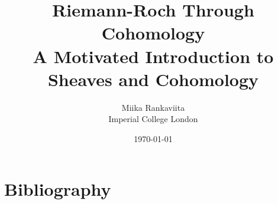 \documentclass[12pt]{article}
\begin{document}
\title{Riemann-Roch Through Cohomology\\
        \large A Motivated Introduction to Sheaves and Cohomology}
\author{Miika Rankaviita\\Imperial College London}
\date{\today}
\maketitle
\tableofcontents

\theoremstyle{plain}
\newtheorem{thm}{Theorem}[section]
\newtheorem{cor}{Corollary}[thm]
\newtheorem{prop}[thm]{Proposition}
\newtheorem{lemm}[thm]{Lemma}
\newtheorem*{rem}{Remark}
\newtheorem*{claim}{Claim}
\theoremstyle{definition}
\newtheorem{defin}[thm]{Definition}
\newtheorem{ex}[thm]{Example}


\newcommand{\diffs}[1]{H^0(X,K_X\otimes\mathcal{L}(#1)^{\vee})}
\newcommand{\dual}[1]{H^1(X,\mathcal{L}(#1))^{\vee}}
\newcommand{\duals}{H^1(X,\mathcal{L}(\kern.08em\bullet\kern.08em))^{\vee}}








\section{Bibliography}


\end{document}
